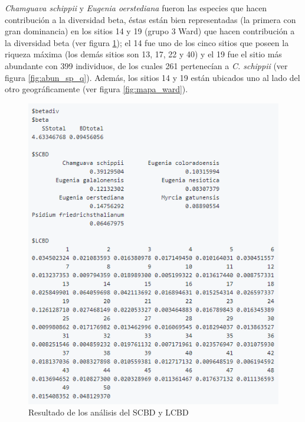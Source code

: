 \documentclass[11pt,]{article}
\begin{document}
\emph{Chamguava schippii} y \emph{Eugenia oerstediana} fueron las
especies que hacen contribución a la diversidad beta, éstas están bien
representadas (la primera con gran dominancia) en los sitios 14 y 19
(grupo 3 Ward) que hacen contribución a la diversidad beta (ver figura
\ref{fig:beta_div}); el 14 fue uno de los cinco sitios que poseen la
riqueza máxima (los demás sitios son 13, 17, 22 y 40) y el 19 fue el
sitio más abundante con 399 individuos, de los cuales 261 pertenecían a
\emph{C. schippii} (ver figura \ref{fig:abun_sp_q}). Además, los sitios
14 y 19 están ubicados uno al lado del otro geográficamente (ver figura
\ref{fig:mapa_ward}).

\begin{figure}
\centering
\includegraphics{beta_div.png}
\caption{Resultado de los análisis del SCBD y LCBD\label{fig:beta_div}}
\end{figure}
\end{document}
